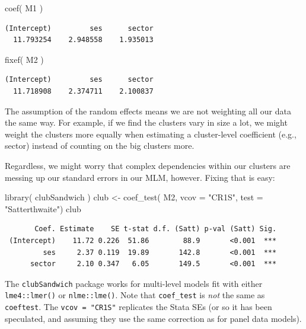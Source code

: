 \documentclass[
  letterpaper,
  DIV=11,
  numbers=noendperiod]{scrreprt}
\newenvironment{Shaded}{\begin{snugshade}}{\end{snugshade}}
\newcommand{\AttributeTok}[1]{\textcolor[rgb]{0.49,0.56,0.16}{#1}}
\newcommand{\FunctionTok}[1]{\textcolor[rgb]{0.02,0.16,0.49}{#1}}
\newcommand{\NormalTok}[1]{\textcolor[rgb]{0.00,0.44,0.13}{#1}}
\newcommand{\OtherTok}[1]{\textcolor[rgb]{0.00,0.44,0.13}{#1}}
\newcommand{\StringTok}[1]{\textcolor[rgb]{0.25,0.44,0.63}{#1}}
\begin{document}
\begin{Shaded}
\begin{Highlighting}[]
\FunctionTok{coef}\NormalTok{( M1 )}
\end{Highlighting}
\end{Shaded}

\begin{verbatim}
(Intercept)         ses      sector 
  11.793254    2.948558    1.935013 
\end{verbatim}

\begin{Shaded}
\begin{Highlighting}[]
\FunctionTok{fixef}\NormalTok{( M2 )}
\end{Highlighting}
\end{Shaded}

\begin{verbatim}
(Intercept)         ses      sector 
  11.718908    2.374711    2.100837 
\end{verbatim}

The assumption of the random effects means we are not weighting all our
data the same way. For example, if we find the clusters vary in size a
lot, we might weight the clusters more equally when estimating a
cluster-level coefficient (e.g., sector) instead of counting on the big
clusters more.

Regardless, we might worry that complex dependencies within our clusters
are messing up our standard errors in our MLM, however. Fixing that is
easy:

\begin{Shaded}
\begin{Highlighting}[]
\FunctionTok{library}\NormalTok{( clubSandwich )}
\NormalTok{club }\OtherTok{\textless{}{-}} \FunctionTok{coef\_test}\NormalTok{( M2,}
           \AttributeTok{vcov =} \StringTok{"CR1S"}\NormalTok{,}
           \AttributeTok{test =} \StringTok{"Satterthwaite"}\NormalTok{)}
\NormalTok{club}
\end{Highlighting}
\end{Shaded}

\begin{verbatim}
       Coef. Estimate    SE t-stat d.f. (Satt) p-val (Satt) Sig.
 (Intercept)    11.72 0.226  51.86        88.9       <0.001  ***
         ses     2.37 0.119  19.89       142.8       <0.001  ***
      sector     2.10 0.347   6.05       149.5       <0.001  ***
\end{verbatim}

The \texttt{clubSandwich} package works for multi-level models fit with
either \texttt{lme4::lmer()} or \texttt{nlme::lme()}. Note that
\texttt{coef\_test} is \emph{not} the same as \texttt{coeftest}. The
\texttt{vcov\ =\ "CR1S"} replicates the Stata SEs (or so it has been
speculated, and assuming they use the same correction as for panel data
models).
\end{document}
